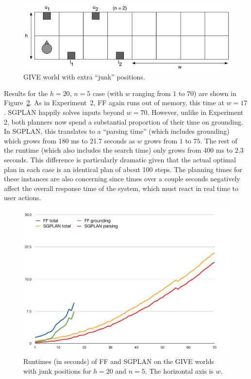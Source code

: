 \begin{figure}
  \centering
  \includegraphics[width=1\columnwidth]{pic-empty-buttons}
  \caption{GIVE world with extra ``junk'' positions.}
  \label{fig:give-junk}
\end{figure}

Results for the $h=20$, $n=5$ case (with $w$ ranging from $1$ to $70$) are
shown in Figure~\ref{fig:give-runtime-junk}. As in Experiment~2, FF again
runs out of memory, this time at $w=17$. SGPLAN happily solves inputs
beyond $w=70$. However, unlike in Experiment 2, both planners now spend a
substantial proportion of their time on grounding. In SGPLAN, this
translates to a ``parsing time'' (which  includes
grounding) which grows from 180 ms to 21.7 seconds as $w$ grows from $1$ to
$75$. The rest of the runtime (which also includes the search time) only
grows from 400 ms to 2.3 seconds. This difference is particularly dramatic
given that the actual optimal plan in each case is an identical plan of
about 100 steps. The planning times for these instances are also concerning
since times over a couple seconds negatively affect the overall response
time of the system, which must react in real time to user actions.

\begin{figure}
  \centering
  \includegraphics[width=1\columnwidth]{pic-runtime-empty-world}
  \caption{Runtimes (in seconds) of FF and SGPLAN on the GIVE worlds with junk
    positions for $h=20$ and $n=5$. The horizontal axis is $w$.}
  \label{fig:give-runtime-junk}
\end{figure}


